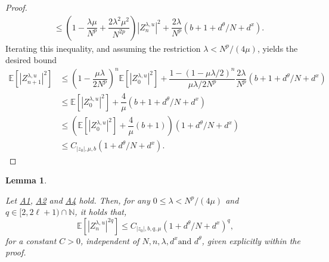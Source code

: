 \documentclass[a4paper, 10pt]{article}
\theoremstyle{plain}%
\newtheorem{lemma}{Lemma}%
\begin{document}
\begin{proof}
\begin{align*}
&\leq\left(1-\dfrac{\lambda\mu}{N^p}+\dfrac{2\lambda^2\mu^2}{N^{2p}}\right)\left|Z_{n}^{\lambda,u}\right|^2+\dfrac{2\lambda}{N^p}\left(b+1+d^{\theta}/N+d^x\right).
\end{align*}
Iterating this inequality, and assuming the restriction $\lambda<N^p/(4\mu)$, yields the desired bound
\begin{align*}
\mathbb{E}\left[\left|Z_{n+1}^{\lambda,u}\right|^2\right]&\leq \left(1-\dfrac{\mu\lambda}{2N^p}\right)^n\mathbb{E}\left[\left|Z_{0}^{\lambda,u}\right|^2\right]+\dfrac{1-(1-\mu\lambda/2)^n}{\mu\lambda/2N^p}\dfrac{2\lambda}{N^p}(b+1+d^{\theta}/N+d^x)\\ &\leq \mathbb{E}\left[\left|Z_{0}^{\lambda,u}\right|^2\right]+\dfrac{4}{\mu}(b+1+d^{\theta}/N+d^x)\\
&\leq \left(\mathbb{E}\left[\left|Z_{0}^{\lambda,u}\right|^2\right]+\dfrac{4}{\mu}(b+1)\right)(1+d^{\theta}/N+d^x)\\
&\leq C_{|z_0|,\mu,b}(1+d^{\theta}/N+d^x).
\end{align*}\end{proof}
\noindent \begin{lemma}\hypertarget{lemma2}{}\label{lemma2} Let \hyperlink{Assum1}{A1}, \hyperlink{Assum2}{A2} and \hyperlink{Assum4}{A4} hold. Then, for any $0\leq\lambda<N^p/(4\mu)$ and $q\in[2,2\ell+1)\cap\mathbb{N}$, it holds that,
$$\mathbb{E}\left[|Z^{\lambda,u}_{n}|^{2q}\right]\leq C_{|z_0|,b,q,\mu}(1+d^{\theta}/N+d^x)^q,$$
for a constant $C>0$, independent of $N,n,\lambda, d^x \text{and } d^{\theta}$, given explicitly within the proof.\end{lemma}
\end{document}
